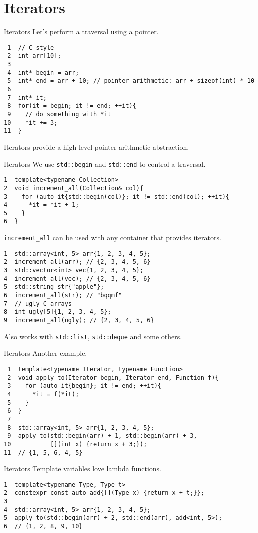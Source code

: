 \documentclass[presentation]{beamer}
\begin{document}
\section{Iterators}
\label{sec:orgcc33bf6}
\begin{frame}[label={sec:org7c34ac7},fragile]{Iterators}
 Let's perform a traversal using a pointer.
\begin{verbatim}
 1  // C style
 2  int arr[10];
 3  
 4  int* begin = arr;
 5  int* end = arr + 10; // pointer arithmetic: arr + sizeof(int) * 10
 6  
 7  int* it;
 8  for(it = begin; it != end; ++it){
 9    // do something with *it
10    *it += 3;
11  }
\end{verbatim}
Iterators provide a high level pointer arithmetic abstraction.
\end{frame}
\begin{frame}[label={sec:org322d9a7},fragile]{Iterators}
 We use \texttt{std::begin} and \texttt{std::end} to control a traversal.
\begin{verbatim}
1  template<typename Collection>
2  void increment_all(Collection& col){
3    for (auto it{std::begin(col)}; it != std::end(col); ++it){
4      *it = *it + 1;
5    }
6  }
\end{verbatim}
\texttt{increment\_all} can be used with any container that provides iterators.
\begin{verbatim}
1  std::array<int, 5> arr{1, 2, 3, 4, 5};
2  increment_all(arr); // {2, 3, 4, 5, 6}
3  std::vector<int> vec{1, 2, 3, 4, 5};
4  increment_all(vec); // {2, 3, 4, 5, 6}
5  std::string str{"apple"};
6  increment_all(str); // "bqqmf"
7  // ugly C arrays
8  int ugly[5]{1, 2, 3, 4, 5};
9  increment_all(ugly); // {2, 3, 4, 5, 6}
\end{verbatim}
Also works with \texttt{std::list}, \texttt{std::deque} and some others.
\end{frame}
\begin{frame}[label={sec:orgb79c1f9},fragile]{Iterators}
 Another example.
\begin{verbatim}
 1  template<typename Iterator, typename Function>
 2  void apply_to(Iterator begin, Iterator end, Function f){
 3    for (auto it{begin}; it != end; ++it){
 4      *it = f(*it);
 5    }
 6  }
 7  
 8  std::array<int, 5> arr{1, 2, 3, 4, 5};
 9  apply_to(std::begin(arr) + 1, std::begin(arr) + 3,
10           [](int x) {return x + 3;});
11  // {1, 5, 6, 4, 5}
\end{verbatim}
\end{frame}
\begin{frame}[label={sec:org77d993c},fragile]{Iterators}
 Template variables love lambda functions.
\begin{verbatim}
1  template<typename Type, Type t>
2  constexpr const auto add{[](Type x) {return x + t;}};
3  
4  std::array<int, 5> arr{1, 2, 3, 4, 5};
5  apply_to(std::begin(arr) + 2, std::end(arr), add<int, 5>);
6  // {1, 2, 8, 9, 10}
\end{verbatim}
\end{frame}
\end{document}
